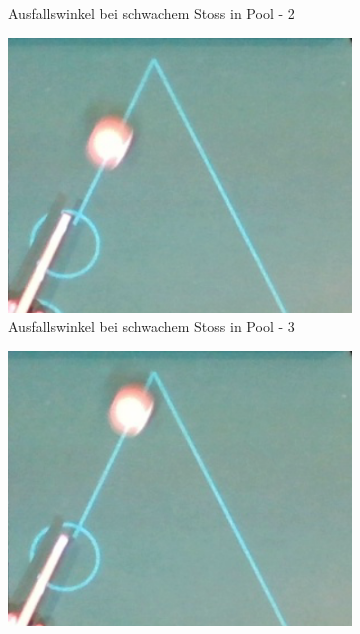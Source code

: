\begin{figure}[h!]
\begin{subfigure}[b]{0.2\textwidth}
        \caption{Ausfallswinkel bei schwachem Stoss in Pool - 2}
        \label{fig:rebound_angle_slow_pool_2}
    \end{subfigure}
    \hfill
    \begin{subfigure}[b]{0.2\textwidth}
        \centering
        \includegraphics[width=1.0\linewidth]{../common/04_results/resources/simulation/rebound_angle_slow_pool/00_rail_rebound_angle_slow_pool_03.png}
        \caption{Ausfallswinkel bei schwachem Stoss in Pool - 3}
        \label{fig:rebound_angle_slow_pool_3}
    \end{subfigure}
    \hfill
    \begin{subfigure}[b]{0.2\textwidth}
        \centering
        \includegraphics[width=1.0\linewidth]{../common/04_results/resources/simulation/rebound_angle_slow_pool/00_rail_rebound_angle_slow_pool_04.png}

\end{subfigure}
\end{figure}

